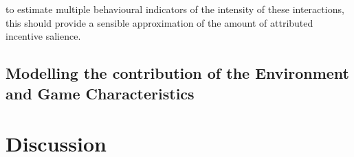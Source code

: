 to estimate multiple behavioural indicators of the intensity of these interactions, this should provide a sensible approximation of the amount of attributed incentive salience. 


\subsection{Modelling the contribution of the Environment and Game Characteristics}
\label{modelling_env_and_game_elements}
\lorem


\section{Discussion}
\lorem